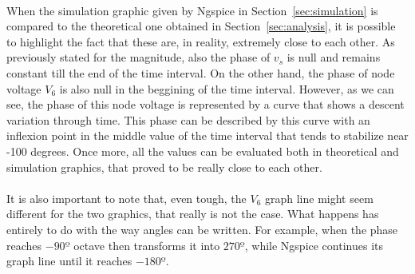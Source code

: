 \paragraph{}
When the simulation graphic given by Ngspice in Section~\ref{sec:simulation} is compared to the theoretical one obtained in Section~\ref{sec:analysis}, it is possible to highlight the fact that these are, in reality, extremely close to each other. As previously stated for the magnitude, also the phase of $v_s$ is null and remains constant till the end of the time interval. On the other hand, the phase of node voltage $V_6$ is also null in the beggining of the time interval. However, as we can see, the phase of this node voltage is represented by a curve that shows a descent variation through time. This phase can be described by this curve with an inflexion point in the middle value of the time interval that tends to stabilize near -100 degrees. Once more, all the values can be evaluated both in theoretical and simulation graphics, that proved to be really close to each other.


\paragraph{}It is also important to note that, even tough, the $V_6$ graph line might seem different for the two graphics, that really is not the case. What happens has entirely to do with the way angles can be written. For example, when the phase reaches $-90º$ octave then transforms it into $270º$, while Ngspice continues its graph line until it reaches $-180º$.














